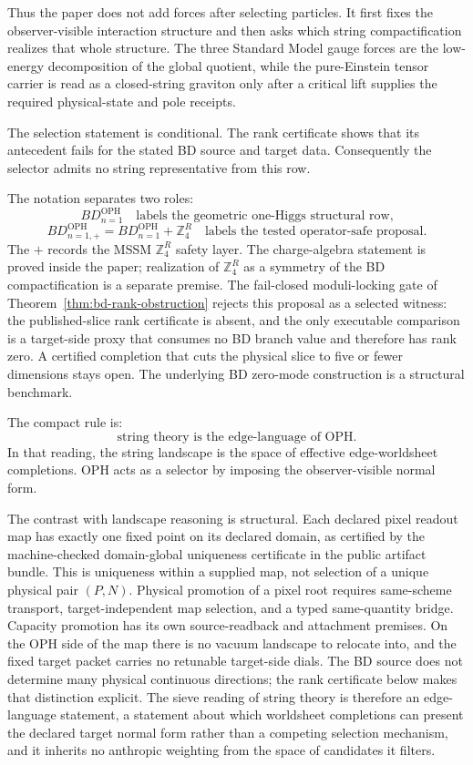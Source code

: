 \documentclass[11pt]{article}
\theoremstyle{remark}
\theoremstyle{plain}
\newcommand{\OPH}{\mathrm{OPH}}
\newcommand{\ZfourR}{\mathbb Z_4^R}
\begin{document}
Thus the paper does not add forces after selecting particles. It first fixes the
observer-visible interaction structure and then asks which string compactification realizes that
whole structure. The three Standard Model gauge forces are the low-energy decomposition of the
global quotient, while the pure-Einstein tensor carrier is read as a closed-string graviton only
after a critical lift supplies the required physical-state and pole receipts.

The selection statement is conditional. The rank certificate shows that
its antecedent fails for the stated BD source and target data. Consequently the selector admits no
string representative from this row.

The notation separates two roles:
\[
BD_{n=1}^{\OPH}
\quad
\text{labels the geometric one-Higgs structural row,}
\]
\[
BD_{n=1,+}^{\OPH}
 =
BD_{n=1}^{\OPH}+\ZfourR
\quad
\text{labels the tested operator-safe proposal.}
\]
The \(+\) records the MSSM \(\ZfourR\) safety layer. The charge-algebra statement is proved
inside the paper; realization of \(\ZfourR\) as a symmetry of the BD compactification is a
separate premise. The fail-closed moduli-locking gate of
Theorem~\ref{thm:bd-rank-obstruction} rejects this proposal as a selected
witness: the published-slice rank certificate is absent, and the only
executable comparison is a target-side proxy that consumes no BD branch value
and therefore has rank zero. A certified completion that cuts the physical
slice to five or fewer dimensions stays open. The underlying BD zero-mode
construction is a structural benchmark.

The compact rule is:
\[
\text{string theory is the edge-language of OPH.}
\]
In that reading, the string landscape is the space of effective edge-worldsheet completions. OPH
acts as a selector by imposing the observer-visible normal form.

The contrast with landscape reasoning is structural. Each declared pixel
readout map has exactly one fixed point on its declared domain, as certified by
the machine-checked domain-global uniqueness certificate in the public
artifact bundle. This is uniqueness within a supplied map, not selection of a
unique physical pair \((P,N)\). Physical promotion of a pixel root requires
same-scheme transport, target-independent map selection, and a typed
same-quantity bridge. Capacity promotion has its own source-readback and
attachment premises.
On the OPH side of the map
there is no vacuum landscape to relocate into, and the fixed target packet carries no
retunable target-side dials. The BD source does not determine many physical
continuous directions; the rank certificate below makes that distinction explicit. The sieve reading of string
theory is therefore an edge-language statement, a statement about which
worldsheet completions can present the declared target normal form rather than a
competing selection mechanism, and it inherits no anthropic weighting from
the space of candidates it filters.
\end{document}
